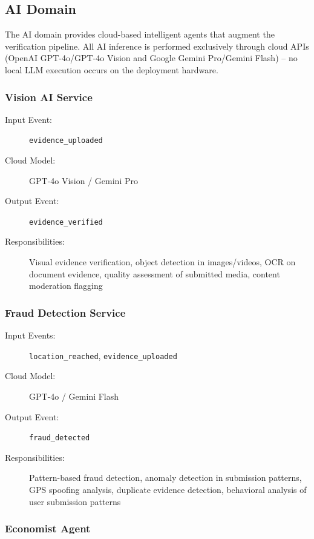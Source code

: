 \documentclass[11pt,a4paper]{article}
\begin{document}
\subsection{AI Domain}

The AI domain provides cloud-based intelligent agents that augment the verification pipeline. All AI inference is performed exclusively through cloud APIs (OpenAI GPT-4o/GPT-4o Vision and Google Gemini Pro/Gemini Flash) -- no local LLM execution occurs on the deployment hardware.

\subsubsection{Vision AI Service}

\begin{description}
  \item[Input Event:] \texttt{evidence\_uploaded}
  \item[Cloud Model:] GPT-4o Vision / Gemini Pro
  \item[Output Event:] \texttt{evidence\_verified}
  \item[Responsibilities:] Visual evidence verification, object detection in images/videos, OCR on document evidence, quality assessment of submitted media, content moderation flagging
\end{description}

\subsubsection{Fraud Detection Service}

\begin{description}
  \item[Input Events:] \texttt{location\_reached}, \texttt{evidence\_uploaded}
  \item[Cloud Model:] GPT-4o / Gemini Flash
  \item[Output Event:] \texttt{fraud\_detected}
  \item[Responsibilities:] Pattern-based fraud detection, anomaly detection in submission patterns, GPS spoofing analysis, duplicate evidence detection, behavioral analysis of user submission patterns
\end{description}

\subsubsection{Economist Agent}
\end{document}
